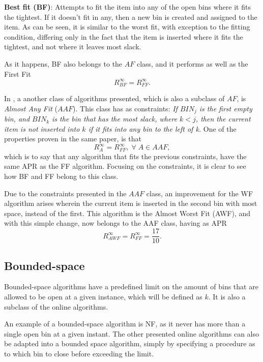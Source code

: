 \textbf{Best fit (BF)}: Attempts to fit the item into any of the open bins where
it fits the tightest. If it doesn't fit in any, then a new bin is created and
assigned to the item. As can be seen, it is similar to the worst fit, with
exception to the fitting condition, differing only in the fact that the item is
inserted where it fits the tightest, and not where it leaves most slack.

As it happens, BF also belongs to the $AF$ class, and it performs as well as the
First Fit
\begin{equation}
    R_{BF}^\infty = R_{FF}^\infty.
\end{equation}

In \cite{johnson1974fast}, a another class of algorithms presented, which is
also a subclass of $AF$, is \textit{Almost Any Fit} ($AAF$). This class has as
constraints: \textit{If $BIN_j$ is the first empty bin, and $BIN_k$ is the bin
that has the most slack, where $k < j$, then the current item is not inserted
into $k$ if it fits into any bin to the left of k.} One of the properties proven
in the same paper, is that 
\begin{equation}
    R_A^\infty = R_{FF}^\infty, \; \forall \; A \in AAF,
\end{equation}
which is to say that any algorithm that fits the previous constraints, have the
same APR as the FF algorithm. Focusing on the constraints, it is clear to see
how BF and FF belong to this class. 

Due to the constraints presented in the $AAF$ class, an improvement for the WF
algorithm arises wherein the current item is inserted in the second bin with
most space, instead of the first. This algorithm is the Almost Worst Fit (AWF),
and with this simple change, now belongs to the AAF class, having as APR
\begin{equation}
    R_{AWF}^\infty = R_{FF}^\infty = \frac{17}{10}.
\end{equation}

\subsection{Bounded-space} 

Bounded-space algorithms have a predefined limit on the amount of bins that are
allowed to be open at a given instance, which will be defined as $k$. It is also
a subclass of the online algorithms.

An example of a bounded-space algorithm is NF, as it never has more than a
single open bin at a given instant. The other presented online algorithms can
also be adapted into a bounded space algorithm, simply by specifying a procedure
as to which bin to close before exceeding the limit.

